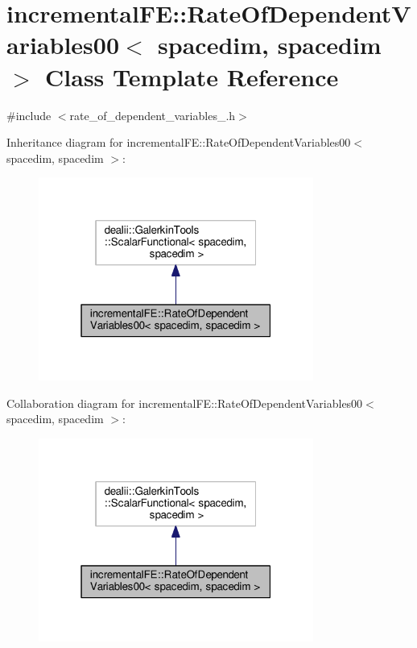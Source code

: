 \hypertarget{classincremental_f_e_1_1_rate_of_dependent_variables00_3_01spacedim_00_01spacedim_01_4}{}\section{incremental\+FE\+:\+:Rate\+Of\+Dependent\+Variables00$<$ spacedim, spacedim $>$ Class Template Reference}
\label{classincremental_f_e_1_1_rate_of_dependent_variables00_3_01spacedim_00_01spacedim_01_4}


{\ttfamily \#include $<$rate\+\_\+of\+\_\+dependent\+\_\+variables\+\_.\+h$>$}



Inheritance diagram for incremental\+FE\+:\+:Rate\+Of\+Dependent\+Variables00$<$ spacedim, spacedim $>$\+:\nopagebreak
\begin{figure}[H]
\begin{center}
\leavevmode
\includegraphics[width=256pt]{classincremental_f_e_1_1_rate_of_dependent_variables00_3_01spacedim_00_01spacedim_01_4__inherit__graph}
\end{center}
\end{figure}


Collaboration diagram for incremental\+FE\+:\+:Rate\+Of\+Dependent\+Variables00$<$ spacedim, spacedim $>$\+:\nopagebreak
\begin{figure}[H]
\begin{center}
\leavevmode
\includegraphics[width=256pt]{classincremental_f_e_1_1_rate_of_dependent_variables00_3_01spacedim_00_01spacedim_01_4__coll__graph}
\end{center}
\end{figure}
